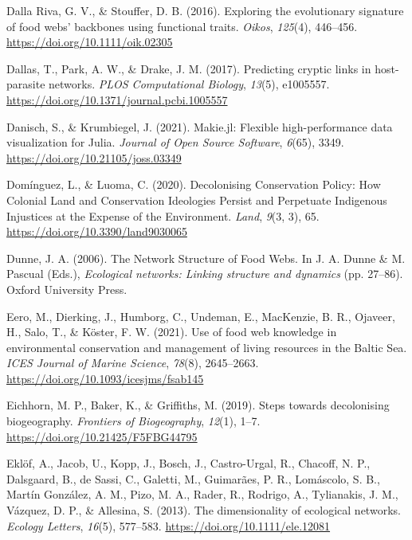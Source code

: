 \documentclass[11pt]{article}
\newlength{\cslhangindent}
\newenvironment{CSLReferences}[2] %
 {%
  \setlength{\parindent}{0pt}
  \ifodd #1 \everypar{\setlength{\hangindent}{\cslhangindent}}\ignorespaces\fi
  \ifnum #2 > 0
  \setlength{\parskip}{#2\baselineskip}
  \fi
 }%
 {}
\begin{document}
\begin{CSLReferences}{1}{0}
\leavevmode{}%
Dalla Riva, G. V., \& Stouffer, D. B. (2016). Exploring the evolutionary
signature of food webs' backbones using functional traits. \emph{Oikos},
\emph{125}(4), 446--456. \url{https://doi.org/10.1111/oik.02305}

\leavevmode{}%
Dallas, T., Park, A. W., \& Drake, J. M. (2017). Predicting cryptic
links in host-parasite networks. \emph{PLOS Computational Biology},
\emph{13}(5), e1005557.
\url{https://doi.org/10.1371/journal.pcbi.1005557}

\leavevmode{}%
Danisch, S., \& Krumbiegel, J. (2021). Makie.jl: Flexible
high-performance data visualization for Julia. \emph{Journal of Open
Source Software}, \emph{6}(65), 3349.
\url{https://doi.org/10.21105/joss.03349}

\leavevmode{}%
Domínguez, L., \& Luoma, C. (2020). Decolonising Conservation Policy:
How Colonial Land and Conservation Ideologies Persist and Perpetuate
Indigenous Injustices at the Expense of the Environment. \emph{Land},
\emph{9}(3, 3), 65. \url{https://doi.org/10.3390/land9030065}

\leavevmode{}%
Dunne, J. A. (2006). The Network Structure of Food Webs. In J. A. Dunne
\& M. Pascual (Eds.), \emph{Ecological networks: Linking structure and
dynamics} (pp. 27--86). Oxford University Press.

\leavevmode{}%
Eero, M., Dierking, J., Humborg, C., Undeman, E., MacKenzie, B. R.,
Ojaveer, H., Salo, T., \& Köster, F. W. (2021). Use of food web
knowledge in environmental conservation and management of living
resources in the Baltic Sea. \emph{ICES Journal of Marine Science},
\emph{78}(8), 2645--2663. \url{https://doi.org/10.1093/icesjms/fsab145}

\leavevmode{}%
Eichhorn, M. P., Baker, K., \& Griffiths, M. (2019). Steps towards
decolonising biogeography. \emph{Frontiers of Biogeography},
\emph{12}(1), 1--7. \url{https://doi.org/10.21425/F5FBG44795}

\leavevmode{}%
Eklöf, A., Jacob, U., Kopp, J., Bosch, J., Castro-Urgal, R., Chacoff, N.
P., Dalsgaard, B., de Sassi, C., Galetti, M., Guimarães, P. R.,
Lomáscolo, S. B., Martín González, A. M., Pizo, M. A., Rader, R.,
Rodrigo, A., Tylianakis, J. M., Vázquez, D. P., \& Allesina, S. (2013).
The dimensionality of ecological networks. \emph{Ecology Letters},
\emph{16}(5), 577--583. \url{https://doi.org/10.1111/ele.12081}


\end{CSLReferences}
\end{document}
